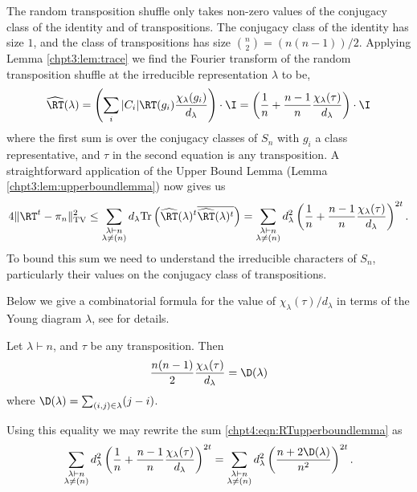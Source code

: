 \documentclass[11pt]{report}
\begin{document}
The random transposition shuffle only takes non-zero values of the conjugacy class of the identity and of transpositions.
The conjugacy class of the identity has size $1$, and the class of transpositions has size ${n 
	\choose 2} = (n(n-1))/2$. Applying 
Lemma \ref{chpt3:lem:trace} we find the Fourier transform 
of the random transposition shuffle at the irreducible representation $\lambda$ to be,
\[\widehat{\RT}(\lambda) = \left(\sum_{i} |C_{i}| \RT(g_{i}) 	
\frac{\chi_{\lambda}(g_{i})}{d_{\lambda}}\right)\cdot \I = 
\left(\frac{1}{n} + \frac{n-1}{n}\frac{\chi_{\lambda}(\tau)}{d_{\lambda}} 
\right)\cdot \I\]
where the first sum is over the conjugacy classes of $S_{n}$ with $g_{i}$ a class representative, and $\tau$ in the second equation is any transposition.	A straightforward application of the Upper Bound Lemma (Lemma \ref{chpt3:lem:upperboundlemma}) now gives us
\begin{eqnarray}
\label{chpt4:eqn:RTupperboundlemma}
4\lVert \RT^{t} -\pi_{n} \rVert_{\tiny \textnormal{TV}}^{2} \leq \sum_{\substack{\lambda \vdash n \\ \lambda \neq (n)}} 
d_{\lambda} \textnormal{Tr}\left( 
\widehat{\RT}(\lambda)^{t}\overline{\widehat{\RT}(\lambda)^{t}}\right) = 
\sum_{\substack{\lambda \vdash n\\\lambda \neq (n)}} 
d_{\lambda}^{2}\left(\frac{1}{n} + 
\frac{n-1}{n}\frac{\chi_{\lambda}(\tau)}{d_{\lambda}} \right)^{2t}.
\end{eqnarray}
To bound this sum we need to understand the irreducible characters of 
$S_{n}$, particularly their values on the conjugacy class of transpositions.


Below we give a combinatorial formula for the value 
of $\chi_{\lambda}(\tau) / d_{\lambda}$ in terms of the Young diagram 
$\lambda$, see \cite[Chapter 3D, Fact 2]{Diaconis1988} for details.
\begin{lemma}
	Let $\lambda \vdash n$, and $\tau$ be any transposition. Then
	\[ \frac{n(n-1)}{2} \frac{\chi_{\lambda}(\tau)}{d_{\lambda}} = \D(\lambda) 
	\]
	where $\D(\lambda) = 
	\sum_{(i,j) \in \lambda} (j-i)$. 
\end{lemma} 

Using this equality we may rewrite the sum 
\eqref{chpt4:eqn:RTupperboundlemma} as 
\begin{eqnarray}
\label{chpt4:eqn:RTdiag}
\sum_{\substack{\lambda \vdash n\\\lambda \neq (n)}} 
d_{\lambda}^{2}\left(\frac{1}{n} + 
\frac{n-1}{n}\frac{\chi_{\lambda}(\tau)}{d_{\lambda}} \right)^{2t} = 	\sum_{\substack{\lambda \vdash n\\\lambda \neq (n)}} 
d_{\lambda}^{2}\left( \frac{n + 2\D(\lambda)}{n^{2}}\right)^{2t} \label{chpt4:eqn:rtfirstbound1}
.
\end{eqnarray}
\end{document}
